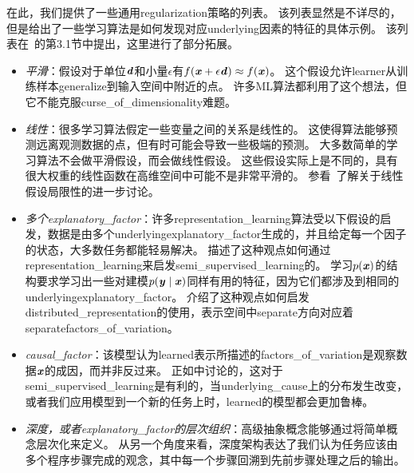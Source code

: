 
在此，我们提供了一些通用\gls{regularization}策略的列表。
该列表显然是不详尽的，但是给出了一些学习算法是如何发现对应\gls{underlying}因素的特征的具体示例。
该列表在~\cite{Bengio-Courville-Vincent-TPAMI-2012}的第3.1节中提出，这里进行了部分拓展。
\begin{itemize}
	\item \emph{平滑}：假设对于单位$\boldsymbol{\mathit{d}}$和小量$\epsilon$有$f(\boldsymbol{\mathit{x}} + \epsilon \boldsymbol{\mathit{d}}) \approx f(\boldsymbol{\mathit{x}})$。
	这个假设允许\gls{learner}从训练样本\gls{generalize}到输入空间中附近的点。
	许多\gls{ML}算法都利用了这个想法，但它不能克服\gls{curse_of_dimensionality}难题。


	\item \emph{线性}：很多学习算法假定一些变量之间的关系是线性的。
	这使得算法能够预测远离观测数据的点，但有时可能会导致一些极端的预测。
	大多数简单的学习算法不会做平滑假设，而会做线性假设。
	这些假设实际上是不同的，具有很大权重的线性函数在高维空间中可能不是非常平滑的。
	参看~\cite{Goodfellow-2015-adversarial}了解关于线性假设局限性的进一步讨论。


	\item \emph{多个\gls{explanatory_factor}}：许多\gls{representation_learning}算法受以下假设的启发，数据是由多个\gls{underlying}\gls{explanatory_factor}生成的，并且给定每一个因子的状态，大多数任务都能轻易解决。
	描述了这种观点如何通过\gls{representation_learning}来启发\gls{semi_supervised_learning}的。
	学习$p(\boldsymbol{\mathit{x}})$的结构要求学习出一些对建模$p(\boldsymbol{\mathit{y}}\mid\boldsymbol{\mathit{x}})$同样有用的特征，因为它们都涉及到相同的\gls{underlying}\gls{explanatory_factor}。
	介绍了这种观点如何启发\gls{distributed_representation}的使用，表示空间中\gls{separate}方向对应着\gls{separate}\gls{factors_of_variation}。


	\item \emph{\gls{causal_factor}}：该模型认为\gls{learned}表示所描述的\gls{factors_of_variation}是观察数据$\boldsymbol{\mathit{x}}$的成因，而并非反过来。
	正如中讨论的，这对于\gls{semi_supervised_learning}是有利的，当\gls{underlying_cause}上的分布发生改变，或者我们应用模型到一个新的任务上时，\gls{learned}的模型都会更加鲁棒。


	\item \emph{深度，或者\gls{explanatory_factor}的层次组织}：高级抽象概念能够通过将简单概念层次化来定义。
	从另一个角度来看，深度架构表达了我们认为任务应该由多个程序步骤完成的观念，其中每一个步骤回溯到先前步骤处理之后的输出。



\end{itemize}
